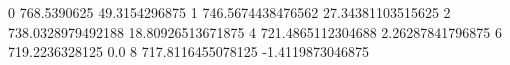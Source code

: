 0 768.5390625 49.3154296875
1 746.5674438476562 27.34381103515625
2 738.0328979492188 18.80926513671875
4 721.4865112304688 2.26287841796875
6 719.2236328125 0.0
8 717.8116455078125 -1.4119873046875

